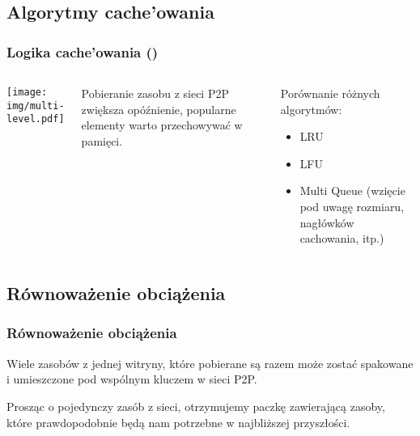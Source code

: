 \documentclass{beamer}
\begin{document}
\subsection{Algorytmy cache'owania}
\begin{frame}
\frametitle{Logika cache'owania (\cite{motwani1995randomized})}
\begin{columns}[c]

\begin{center}
\texttt{[image: img/multi-level.pdf]}
\end{center}

\begin{block}{}
Pobieranie zasobu z sieci P2P zwiększa opóźnienie, 
popularne elementy warto przechowywać w pamięci.
\end{block}

\begin{block}{}
Porównanie różnych algorytmów:
\begin{itemize}
  \item LRU
  \item LFU
  \item Multi Queue (wzięcie pod uwagę rozmiaru, nagłówków cachowania, itp.)
\end{itemize}
\end{block}

\end{columns}
\end{frame}

\subsection{Równoważenie obciążenia}
\begin{frame}
\frametitle{Równoważenie obciążenia}

\begin{block}{}
Wiele zasobów z jednej witryny, które pobierane są razem może zostać spakowane
i umieszczone pod wspólnym kluczem w sieci P2P.
\end{block}

\begin{block}{}
Prosząc o pojedynczy zasób z sieci, otrzymujemy paczkę zawierającą zasoby, które
prawdopodobnie będą nam potrzebne w najbliższej przyszłości.
\end{block}

\end{frame}
\end{document}
